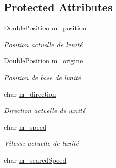 \subsection*{Protected Attributes}
\begin{DoxyCompactItemize}
\item 
\hypertarget{class_unit_ac4c086ea3b94b3be426c081b33244ca1}{}\hyperlink{class_double_position}{Double\+Position} \hyperlink{class_unit_ac4c086ea3b94b3be426c081b33244ca1}{m\+\_\+position}\label{class_unit_ac4c086ea3b94b3be426c081b33244ca1}

\begin{DoxyCompactList}\small\item\em Position actuelle de l\textquotesingle{}unité \end{DoxyCompactList}\item 
\hypertarget{class_unit_adf868b599517d73750fe30531164f121}{}\hyperlink{class_double_position}{Double\+Position} \hyperlink{class_unit_adf868b599517d73750fe30531164f121}{m\+\_\+origine}\label{class_unit_adf868b599517d73750fe30531164f121}

\begin{DoxyCompactList}\small\item\em Position de base de l\textquotesingle{}unité \end{DoxyCompactList}\item 
\hypertarget{class_unit_a6ef9090f1e7e35c32dc2ad88cb1af761}{}char \hyperlink{class_unit_a6ef9090f1e7e35c32dc2ad88cb1af761}{m\+\_\+direction}\label{class_unit_a6ef9090f1e7e35c32dc2ad88cb1af761}

\begin{DoxyCompactList}\small\item\em Direction actuelle de l\textquotesingle{}unité \end{DoxyCompactList}\item 
\hypertarget{class_unit_a89e65c03176c3485a103c8d74fea84e4}{}char \hyperlink{class_unit_a89e65c03176c3485a103c8d74fea84e4}{m\+\_\+speed}\label{class_unit_a89e65c03176c3485a103c8d74fea84e4}

\begin{DoxyCompactList}\small\item\em Vitesse actuelle de l\textquotesingle{}unité \end{DoxyCompactList}\item 
\hypertarget{class_unit_aa9dff9898710a724a36c04ef55b1eecd}{}char \hyperlink{class_unit_aa9dff9898710a724a36c04ef55b1eecd}{m\+\_\+scared\+Speed}\label{class_unit_aa9dff9898710a724a36c04ef55b1eecd}


\end{DoxyCompactItemize}

